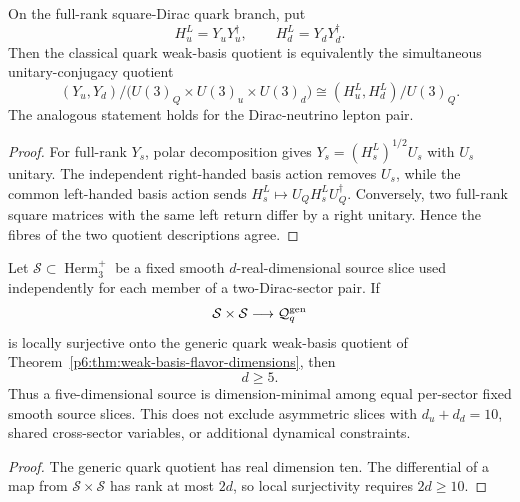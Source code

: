 \documentclass[11pt,a4paper]{article}
\begin{document}
\begin{lemma}
\label{p6:lem:v548-left-return-reduction}
On the full-rank square-Dirac quark branch, put
\[
 H_u^L=Y_uY_u^\dagger,
 \qquad
 H_d^L=Y_dY_d^\dagger.
\]
Then the classical quark weak-basis quotient is equivalently the simultaneous
unitary-conjugacy quotient
\[
 \boxed{
 (Y_u,Y_d)/\bigl(U(3)_Q\times U(3)_u\times U(3)_d\bigr)
 \cong
 (H_u^L,H_d^L)/U(3)_Q.}
\]
The analogous statement holds for the Dirac-neutrino lepton pair.
\end{lemma}
\begin{proof}
For full-rank $Y_s$, polar decomposition gives
$Y_s=(H_s^L)^{1/2}U_s$ with $U_s$ unitary.  The independent right-handed
basis action removes $U_s$, while the common left-handed basis action sends
$H_s^L\mapsto U_QH_s^LU_Q^\dagger$.  Conversely, two full-rank square
matrices with the same left return differ by a right unitary.  Hence the
fibres of the two quotient descriptions agree.
\end{proof}

\begin{proposition}
\label{p6:prop:v548-equal-slice-minimality}
Let $\mathcal S\subset\operatorname{Herm}_3^{+}$ be a fixed smooth
$d$-real-dimensional source slice used independently for each member of a
two-Dirac-sector pair.  If
\[
 \mathcal S\times\mathcal S
 \longrightarrow \mathcal Q_q^{\rm gen}
\]
is locally surjective onto the generic quark weak-basis quotient of
Theorem~\ref{p6:thm:weak-basis-flavor-dimensions}, then
\[
 \boxed{d\ge5.}
\]
Thus a five-dimensional source is dimension-minimal among equal per-sector
fixed smooth source slices.  This does not exclude asymmetric slices with
$d_u+d_d=10$, shared cross-sector variables, or additional dynamical
constraints.
\end{proposition}
\begin{proof}
The generic quark quotient has real dimension ten.  The differential of a
map from $\mathcal S\times\mathcal S$ has rank at most $2d$, so local
surjectivity requires $2d\ge10$.
\end{proof}
\end{document}

